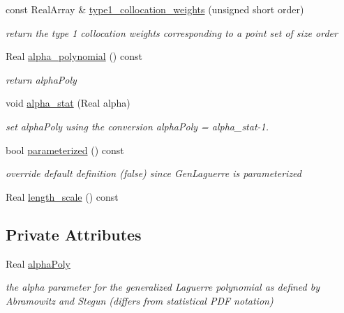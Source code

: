 \begin{DoxyCompactItemize}
const Real\+Array \& \hyperlink{classPecos_1_1GenLaguerreOrthogPolynomial_aa010321cf47465dca5725fa15ba58bf6}{type1\+\_\+collocation\+\_\+weights} (unsigned short order)
\begin{DoxyCompactList}\small\item\em return the type 1 collocation weights corresponding to a point set of size order \end{DoxyCompactList}\item 
Real \hyperlink{classPecos_1_1GenLaguerreOrthogPolynomial_a997bdeddf670667c476513fcacc779ca}{alpha\+\_\+polynomial} () const \label{classPecos_1_1GenLaguerreOrthogPolynomial_a997bdeddf670667c476513fcacc779ca}

\begin{DoxyCompactList}\small\item\em return alpha\+Poly \end{DoxyCompactList}\item 
void \hyperlink{classPecos_1_1GenLaguerreOrthogPolynomial_aeeb4ce11a8d413209be1ec08eced8728}{alpha\+\_\+stat} (Real alpha)\label{classPecos_1_1GenLaguerreOrthogPolynomial_aeeb4ce11a8d413209be1ec08eced8728}

\begin{DoxyCompactList}\small\item\em set alpha\+Poly using the conversion alpha\+Poly = alpha\+\_\+stat-\/1. \end{DoxyCompactList}\item 
bool \hyperlink{classPecos_1_1GenLaguerreOrthogPolynomial_abc2afafc150f648667a41e0ce656b6da}{parameterized} () const \label{classPecos_1_1GenLaguerreOrthogPolynomial_abc2afafc150f648667a41e0ce656b6da}

\begin{DoxyCompactList}\small\item\em override default definition (false) since Gen\+Laguerre is parameterized \end{DoxyCompactList}\item 
Real \hyperlink{classPecos_1_1GenLaguerreOrthogPolynomial_a8c1e8d014e82efc5a1c20f973b5bc715}{length\+\_\+scale} () const 
\end{DoxyCompactItemize}
\subsection*{Private Attributes}
\begin{DoxyCompactItemize}
\item 
Real \hyperlink{classPecos_1_1GenLaguerreOrthogPolynomial_a11666846719189915a02ac6f1f96e393}{alpha\+Poly}\label{classPecos_1_1GenLaguerreOrthogPolynomial_a11666846719189915a02ac6f1f96e393}

\begin{DoxyCompactList}\small\item\em the alpha parameter for the generalized Laguerre polynomial as defined by Abramowitz and Stegun (differs from statistical P\+DF notation) \end{DoxyCompactList}\end{DoxyCompactItemize}
